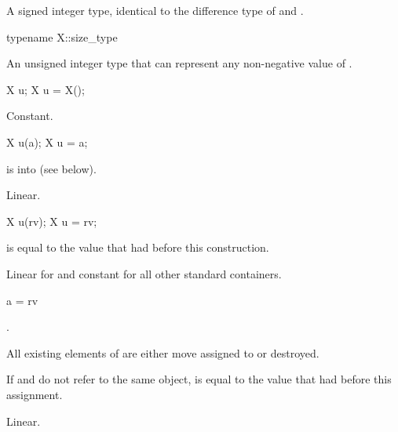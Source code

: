 \begin{itemdescr}
\pnum
\result
A signed integer type,
identical to the difference type of
 and .
\end{itemdescr}

%
\begin{itemdecl}
typename X::size_type
\end{itemdecl}

\begin{itemdescr}
\pnum
\result
An unsigned integer type
that can represent any non-negative value of .
\end{itemdescr}

\begin{itemdecl}
X u;
X u = X();
\end{itemdecl}

\begin{itemdescr}
\pnum
\ensures
{}

\pnum
\complexity
Constant.
\end{itemdescr}

\begin{itemdecl}
X u(a);
X u = a;
\end{itemdecl}

\begin{itemdescr}
\pnum
\expects
{} is  into  (see below).

\pnum
\ensures
{}

\pnum
\complexity
Linear.
\end{itemdescr}

\begin{itemdecl}
X u(rv);
X u = rv;
\end{itemdecl}

\begin{itemdescr}
\pnum
\ensures
{} is equal to the value that  had before this construction.

\pnum
\complexity
Linear for  and constant for all other standard containers.
\end{itemdescr}

\begin{itemdecl}
a = rv
\end{itemdecl}

\begin{itemdescr}
\pnum
\result
{}.

\pnum
\effects
All existing elements of  are either move assigned to or destroyed.

\pnum
\ensures
If  and  do not refer to the same object,
 is equal to the value that  had before this assignment.

\pnum
\complexity
Linear.
\end{itemdescr}

